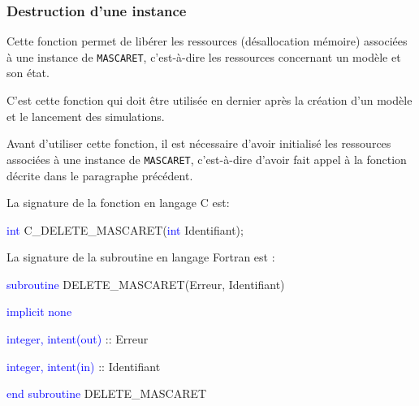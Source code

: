 \documentclass[a4paper,11pt]{article}
\begin{document}
\subsubsection{Destruction d'une instance}

 Cette fonction permet de lib\'erer les ressources (d\'esallocation m\'emoire) associ\'ees \`a une instance de \texttt{MASCARET}, c'est-\`a-dire les ressources concernant un mod\`ele et son \'etat.
 
 \vspace{0.5cm}
  
 C'est cette fonction qui doit \^etre utilis\'ee en dernier apr\`es la cr\'eation d'un mod\`ele et le lancement des simulations.
 
 \vspace{0.5cm}
 
 Avant d'utiliser cette fonction, il est n\'ecessaire d'avoir initialis\'e les ressources associ\'ees \`a une instance de \texttt{MASCARET}, c'est-\`a-dire d'avoir fait appel \`a la fonction d\'ecrite dans le paragraphe pr\'ec\'edent.
 
 \vspace{0.5cm} 
 
 La signature de la fonction en langage C est:
 
 \vspace{0.5cm}
 
 \textcolor{blue}{int} C\_DELETE\_MASCARET(\textcolor{blue}{int} Identifiant);
 
 \vspace{0.5cm} 
 
 La signature de la subroutine en langage Fortran est :
 
 \vspace{0.5cm}
 
    \textcolor{blue}{subroutine} DELETE\_MASCARET(Erreur, Identifiant)
    
        \hspace{1cm}\textcolor{blue}{implicit none}                 
        
        \hspace{1cm} \textcolor{blue}{integer, intent(out)} :: Erreur
        
        \hspace{1cm} \textcolor{blue}{integer, intent(in)}  :: Identifiant
        
    \textcolor{blue}{end subroutine} DELETE\_MASCARET

  \vspace{0.5cm}
\end{document}
